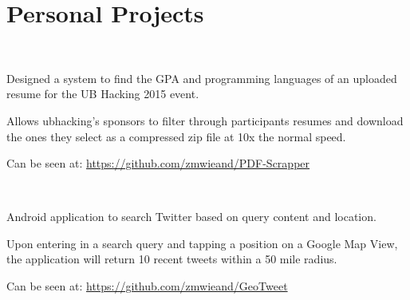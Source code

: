 \documentclass[letterpaper]{deedy-resume} %
\begin{document}
\begin{minipage}[t]{0.66\textwidth}


\sectionspace %


\section{Personal Projects} 

 \\

\begin{tightitemize}
\item Designed a system to find the GPA and programming languages of an uploaded resume for the UB Hacking 2015 event.
\item Allows ubhacking's sponsors to filter through participants resumes and download the ones they select as a compressed zip file at 10x the normal speed.
\item Can be seen at:  \url{https://github.com/zmwieand/PDF-Scrapper}
\end{tightitemize}

\sectionspace %

 \\

\begin{tightitemize}
\item Android application to search Twitter based on query content and location.
\item Upon entering in a search query and tapping a position on a Google Map View, the application will return 10 recent tweets within a 50 mile radius.
\item Can be seen at: \url{https://github.com/zmwieand/GeoTweet}
\end{tightitemize}


\end{minipage}
\end{document}
